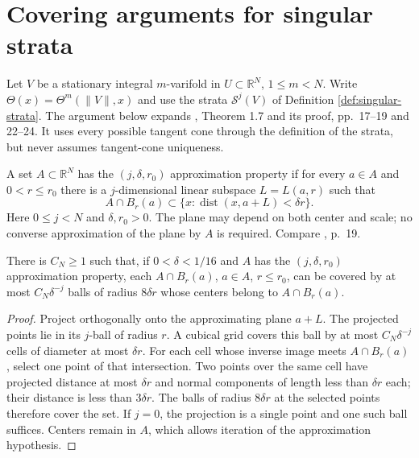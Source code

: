 \chapter{Covering arguments for singular strata}\label{sec:strata-covering}
Let $V$ be a stationary integral $m$-varifold in $U\subset\mathbb R^N$, $1\leq m<N$. Write $\Theta(x)=\Theta^m(\|V\|,x)$ and use the strata $\mathcal S^j(V)$ of Definition \ref{def:singular-strata}. The argument below expands \cite{Minter}, Theorem 1.7 and its proof, pp.~17--19 and 22--24. It uses every possible tangent cone through the definition of the strata, but never assumes tangent-cone uniqueness.

\begin{definition}\label{def:one-sided-plane-approximation}
A set $A\subset\mathbb R^N$ has the $(j,\delta,r_0)$ approximation property if for every $a\in A$ and $0<r\leq r_0$ there is a $j$-dimensional linear subspace $L=L(a,r)$ such that
\[
 A\cap B_r(a)\subset\{x:\operatorname{dist}(x,a+L)<\delta r\}.
\]
Here $0\leq j<N$ and $\delta,r_0>0$. The plane may depend on both center and scale; no converse approximation of the plane by $A$ is required. Compare \cite{Minter}, p.~19.
\end{definition}

\begin{lemma}\label{lem:flat-cover-refinement}
There is $C_N\geq1$ such that, if $0<\delta<1/16$ and $A$ has the $(j,\delta,r_0)$ approximation property, each $A\cap B_r(a)$, $a\in A$, $r\leq r_0$, can be covered by at most $C_N\delta^{-j}$ balls of radius $8\delta r$ whose centers belong to $A\cap B_r(a)$.
\end{lemma}
\begin{proof}
Project orthogonally onto the approximating plane $a+L$. The projected points lie in its $j$-ball of radius $r$. A cubical grid covers this ball by at most $C_N\delta^{-j}$ cells of diameter at most $\delta r$. For each cell whose inverse image meets $A\cap B_r(a)$, select one point of that intersection. Two points over the same cell have projected distance at most $\delta r$ and normal components of length less than $\delta r$ each; their distance is less than $3\delta r$. The balls of radius $8\delta r$ at the selected points therefore cover the set. If $j=0$, the projection is a single point and one such ball suffices. Centers remain in $A$, which allows iteration of the approximation hypothesis.
\end{proof}

